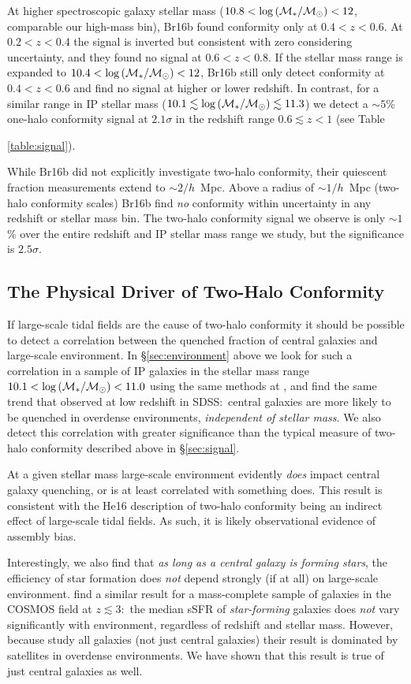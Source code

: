 At higher spectroscopic galaxy stellar mass (${10.8 < \logM < 12}$, comparable our high-mass bin), Br16b found conformity only at ${0.4<z<0.6}$.
At ${0.2<z<0.4}$ the signal is inverted but consistent with zero considering uncertainty, and they found no signal at ${0.6<z<0.8}$.
If the stellar mass range is expanded to ${10.4 < \logM < 12}$, Br16b still only detect conformity at ${0.4<z<0.6}$ and find no signal at higher or lower redshift.
In contrast, for a similar range in IP stellar mass (${10.1\lesssim \logM \lesssim11.3}$) we detect a $\sim5$\% one-halo conformity signal at $2.1\sigma$ in the redshift range ${0.6\lesssim z<1}$ (see Table~{\ref{table:signal}).

While Br16b did not explicitly investigate two-halo conformity, their quiescent fraction measurements extend to $\sim2/h$~Mpc.
Above a radius of $\sim1/h$~Mpc (two-halo conformity scales) Br16b find \emph{no} conformity within uncertainty in any redshift or stellar mass bin.
The two-halo conformity signal we observe is only $\sim1$\% over the entire redshift and IP stellar mass range we study, but the significance is $2.5\sigma$.

\subsection{The Physical Driver of Two-Halo Conformity}

If large-scale tidal fields are the cause of two-halo conformity it should be possible to detect a correlation between the quenched fraction of central galaxies and large-scale environment.
In \S\ref{sec:environment} above we look for such a correlation in a sample of IP galaxies in the stellar mass range ${10.1 < \logM < 11.0}$ using the same methods at \citePB, and find the same trend that \citePB observed at low redshift in SDSS:~central galaxies are more likely to be quenched in overdense environments, \emph{independent of stellar mass}.
We also detect this correlation with greater significance than the typical measure of two-halo conformity described above in \S\ref{sec:signal}.

At a given stellar mass large-scale environment evidently \emph{does} impact central galaxy quenching, or is at least correlated with something does.
This result is consistent with the He16 description of two-halo conformity being an indirect effect of large-scale tidal fields.
As such, it is likely observational evidence of assembly bias.

Interestingly, we also find that \emph{as long as a central galaxy is forming stars}, the efficiency of star formation does \emph{not} depend strongly (if at all) on large-scale environment.
\citet{Darvish16} find a similar result for a mass-complete sample of galaxies in the COSMOS field at $z\lesssim3$:~the median sSFR of \emph{star-forming} galaxies does \emph{not} vary significantly with environment, regardless of redshift and stellar mass.
However, because \cite{Darvish16} study all galaxies (not just central galaxies) their result is dominated by satellites in overdense environments.
We have shown that this result is true of just central galaxies as well.

}

